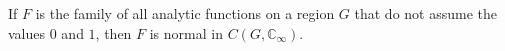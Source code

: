 If $F$ is the family of all analytic functions on a region $G$ that do not assume the values $0$ and $1$, then $F$ is normal in $C(G, \mathbb{C}_\infty)$.
